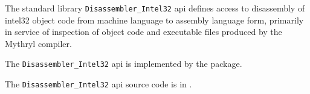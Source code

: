 
The standard library {\tt Disassembler\_Intel32} api defines access to disassembly of intel32 object code 
from machine language to assembly language form, primarily in service of inspection of object 
code and executable files produced by the Mythryl compiler.

The {\tt Disassembler\_Intel32} api is implemented by the  package.

The {\tt Disassembler\_Intel32} api source code is in .

